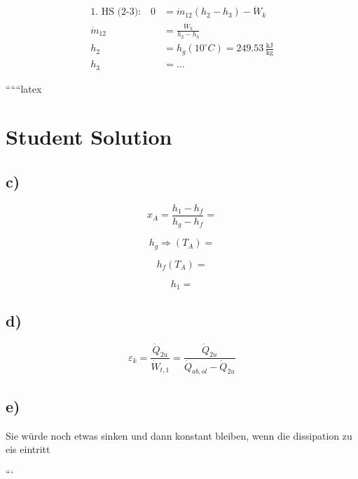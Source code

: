 \[
\begin{aligned}
    \text{1. HS (2-3):} \quad 0 &= \dot{m}_{12} (h_2 - h_3) - \dot{W}_k \\
    \dot{m}_{12} &= \frac{\dot{W}_k}{h_2 - h_3} \\
    h_2 &= h_g (10^\circ C) = 249.53 \, \frac{\text{kJ}}{\text{kg}} \\
    h_3 &= \ldots
\end{aligned}
\]

``````latex


\section*{Student Solution}

\subsection*{c)}
\[
x_{A} = \frac{h_{1} - h_{f}}{h_{g} - h_{f}} = 
\]

\[
h_{g} \Rightarrow (T_{A}) = 
\]

\[
h_{f} (T_{A}) = 
\]

\[
h_{1} = 
\]

\subsection*{d)}
\[
\varepsilon_{k} = \frac{\dot{Q}_{2u}}{\dot{W}_{t,1}} = \frac{\dot{Q}_{2u}}{\dot{Q}_{ab,ol} - \dot{Q}_{2u}}
\]

\subsection*{e)}
Sie würde noch etwas sinken und dann konstant bleiben, wenn die  dissipation zu eis eintritt

```